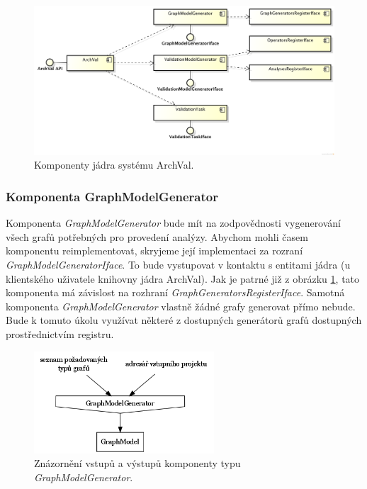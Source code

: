 \begin{figure}[h!]
  \centering
  \includegraphics[width=1.0\textwidth]{./uml/archval_core_cmp.png}
  \caption{Komponenty jádra systému ArchVal.\label{design-archval_core}}
\end{figure}

\subsubsection{Komponenta GraphModelGenerator}
Komponenta \emph{GraphModelGenerator} bude mít na zodpovědnosti vygenerování všech grafů potřebných pro provedení analýzy. Abychom mohli časem komponentu reimplementovat, skryjeme její implementaci za rozraní \emph{GraphModelGeneratorIface}. To bude vystupovat v kontaktu s  entitami jádra (u klientského uživatele knihovny jádra ArchVal). Jak je patrné již z obrázku \ref{design-archval_core}, tato komponenta má závislost na rozhraní \emph{GraphGeneratorsRegisterIface}. Samotná komponenta \emph{GraphModelGenerator} vlastně žádné grafy generovat přímo nebude. Bude k tomuto úkolu využívat některé z dostupných generátorů grafů dostupných prostřednictvím registru.

\begin{figure}[h!]
  \centering
  \includegraphics[width=0.6\textwidth]{./graphs/graph_generator_io_graph.png}
  \caption{Znázornění vstupů a výstupů komponenty typu \emph{GraphModelGenerator}.\label{design-graph_generator_io}}
\end{figure}

